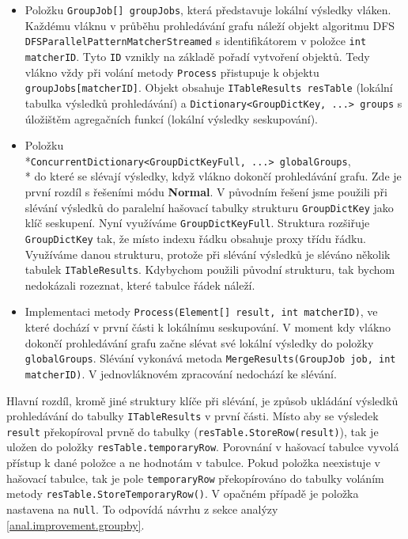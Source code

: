 \begin{itemize}

\item Položku \texttt{GroupJob[] groupJobs}, která představuje lokální výsledky vláken.
Každému vláknu v průběhu prohledávání grafu náleží objekt algoritmu DFS \texttt{DFSParallelPatternMatcherStreamed} s identifikátorem v položce \texttt{int matcherID}.
Tyto \texttt{ID} vznikly na základě pořadí vytvoření objektů. 
Tedy vlákno vždy při volání metody \texttt{Process} přistupuje k objektu \texttt{groupJobs[matcherID]}.
Objekt obsahuje \texttt{ITableResults resTable} (lokální tabulka výsledků prohledávání) a \texttt{Dictionary<GroupDictKey, ...> groups} s úložištěm agregačních funkcí (lokální výsledky seskupování).

\item Položku \\*\texttt{ConcurrentDictionary<GroupDictKeyFull, ...> globalGroups},\\* do které se slévají výsledky, když vlákno dokončí prohledávání grafu.
Zde je první rozdíl s řešeními módu \textbf{Normal}.
V původním řešení jsme použili při slévání výsledků do paralelní hašovací tabulky strukturu \texttt{GroupDictKey} jako klíč seskupení.
Nyní využíváme \texttt{GroupDictKeyFull}.
Struktura rozšiřuje \texttt{GroupDictKey} tak, že místo indexu řádku obsahuje proxy třídu řádku.
Využíváme danou strukturu, protože při slévání výsledků je sléváno několik tabulek \texttt{ITableResults}.
Kdybychom použili původní strukturu, tak bychom nedokázali rozeznat, které tabulce řádek náleží.

\item Implementaci metody \texttt{Process(Element[] result, int matcherID)}, ve které dochází v první části k lokálnímu seskupování.
V moment kdy vlákno dokončí prohledávání grafu začne slévat své lokální výsledky do položky \texttt{globalGroups}.
Slévání vykonává metoda \texttt{MergeResults(GroupJob job, int matcherID)}.
V jednovláknovém zpracování nedochází ke slévání.
\end{itemize}
Hlavní rozdíl, kromě jiné struktury klíče při slévání, je způsob ukládání výsledků prohledávání do tabulky \texttt{ITableResults} v první části.
Místo aby se výsledek \texttt{result} překopíroval prvně do tabulky (\texttt{resTable.StoreRow(result)}), tak je uložen do položky \texttt{resTable.temporaryRow}.
Porovnání v hašovací tabulce vyvolá přístup k dané položce a ne hodnotám v tabulce.
Pokud položka neexistuje v hašovací tabulce, tak je pole \texttt{temporaryRow} překopírováno do tabulky voláním metody \texttt{resTable.StoreTemporaryRow()}.
V opačném případě je položka nastavena na \texttt{null}. To odpovídá návrhu z sekce analýzy \ref{anal.improvement.groupby}. 

